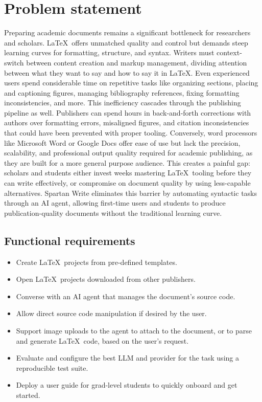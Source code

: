 \section{Problem statement}

Preparing academic documents remains a significant bottleneck for researchers and scholars.
\LaTeX\ offers unmatched quality and control but demands steep learning curves for formatting, structure, and syntax.
Writers must context-switch between content creation and markup management, dividing attention between what they want to say and how to say it in \LaTeX.
Even experienced users spend considerable time on repetitive tasks like organizing sections, placing and captioning figures, managing bibliography references, fixing formatting inconsistencies, and more.
This inefficiency cascades through the publishing pipeline as well.
Publishers can spend hours in back-and-forth corrections with authors over formatting errors, misaligned figures, and citation inconsistencies that could have been prevented with proper tooling.
Conversely, word processors like Microsoft Word or Google Docs offer ease of use but lack the precision, scalability, and professional output quality required for academic publishing, as they are built for a more general purpose audience.
This creates a painful gap: scholars and students either invest weeks mastering \LaTeX\ tooling before they can write effectively, or compromise on document quality by using less-capable alternatives.
Spartan Write eliminates this barrier by automating syntactic tasks through an AI agent, allowing first-time users and students to produce publication-quality documents without the traditional learning curve.

\subsection{Functional requirements}

\begin{itemize}
    \item Create \LaTeX\ projects from pre-defined templates.
    \item Open \LaTeX\ projects downloaded from other publishers.
    \item Converse with an AI agent that manages the document's source code.
    \item Allow direct source code manipulation if desired by the user.
    \item Support image uploads to the agent to attach to the document, or to parse and generate \LaTeX\ code, based on the user's request.
    \item Evaluate and configure the best LLM and provider for the task using a reproducible test suite.
    \item Deploy a user guide for grad-level students to quickly onboard and get started.
\end{itemize}

